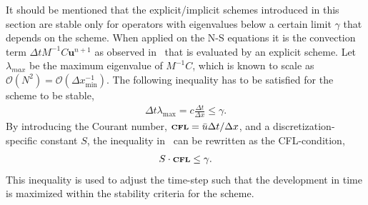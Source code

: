 


It should be mentioned that the explicit/implicit schemes introduced in this section are 
stable only for operators with eigenvalues below a certain limit $\gamma$ that depends 
on the scheme. When applied on the N-S 
equations it is the convection term $\Delta t M^{-1}C\mathbf{u}^{n+1}$
as observed in~ that is evaluated by
an explicit scheme. Let $\lambda_{max}$ be the maximum eigenvalue of
$M^{-1}C$, which is known to scale as 
$\mathcal{O}(N^{2})=\mathcal{O}(\Delta x_{\min}^{-1})$. The following inequality 
has to be satisfied for the scheme to be stable, 
%
\begin{align}
    \Delta t \lambda_{\max} = c\frac{\Delta t}{\Delta x} \le \gamma.
    \label{eq:restriction}
\end{align}
%
By introducing the Courant number, $\mbox{\scriptsize{\bf{CFL}}} = \bar u \Delta t/ \Delta x$,
and a discretization-specific constant $S$, the inequality in~ 
can be rewritten as the CFL-condition,
%
\begin{align}
    S \cdot \mbox{\scriptsize{\bf{CFL}}}   \le \gamma.
    \label{eq:CFLcondition}
\end{align}
%
This inequality is used to adjust the time-step such that the development in time is maximized
within the stability criteria for the scheme.

